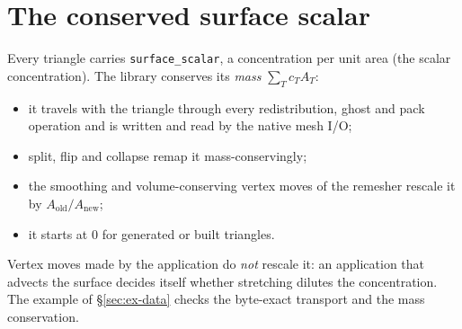 \section{The conserved surface scalar}

Every triangle carries \texttt{surface\_scalar}, a concentration per unit area (the \mftlone{}
scalar concentration). The library conserves its \emph{mass} $\sum_T c_T A_T$:
\begin{itemize}
  \item it travels with the triangle through every redistribution, ghost and pack operation and
    is written and read by the native mesh I/O;
  \item split, flip and collapse remap it mass-conservingly;
  \item the smoothing and volume-conserving vertex moves of the remesher rescale it by
    $A_{\text{old}}/A_{\text{new}}$;
  \item it starts at 0 for generated or built triangles.
\end{itemize}
Vertex moves made by the application do \emph{not} rescale it: an application that advects the
surface decides itself whether stretching dilutes the concentration. The example of
\S\ref{sec:ex-data} checks the byte-exact transport and the mass conservation.
